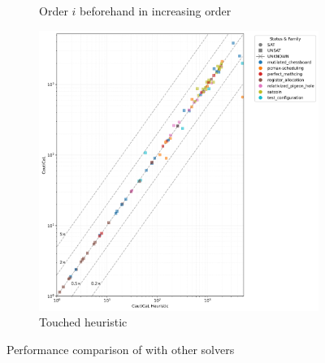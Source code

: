 \begin{figure}[!t]
\begin{subfigure}[t]{0.3\textwidth}
        \caption{Order $i$ beforehand in increasing order}
        \label{fig:cautical-vs-prelearn}
    \end{subfigure}
    \begin{subfigure}[t]{0.3\textwidth}
        \centering
        \includegraphics[width=\textwidth]{figs/globaltouch_heuristic_comparison.jpg}
        \caption{Touched heuristic}
        \label{fig:cautical-vs-prelearn}
    \end{subfigure}

    \caption{Performance comparison of \tool with other solvers}
    \label{fig:solver-comparison}
\end{figure}
